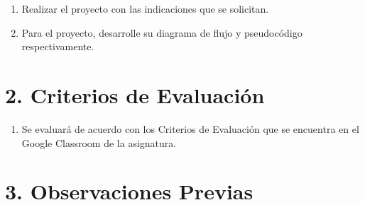 \documentclass[12pt]{article}
\begin{document}
\begin{enumerate}
    \item Realizar el proyecto con las indicaciones que se solicitan.
    \item Para el proyecto, desarrolle su diagrama de flujo y pseudocódigo respectivamente.
\end{enumerate}

\section{\large 2. Criterios de Evaluación}

\begin{enumerate}
    \item Se evaluará de acuerdo con los Criterios de Evaluación que se encuentra en el Google Classroom de la asignatura.
\end{enumerate}

\section{\large 3. Observaciones Previas}
\end{document}
